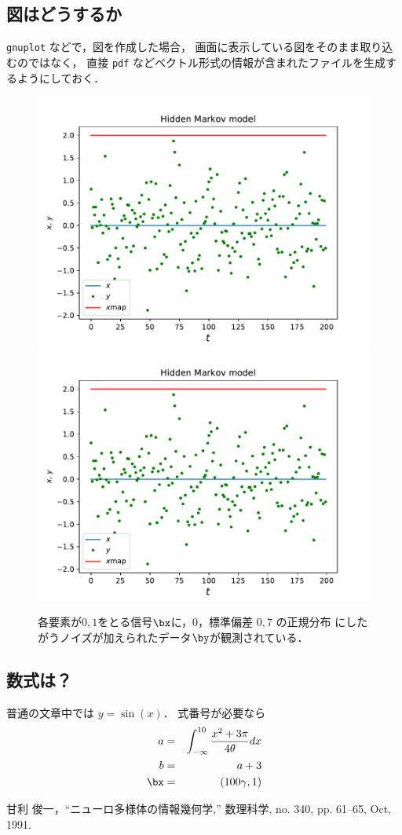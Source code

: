 \documentclass[a4paper,11pt,dvipdfmx]{jarticle}
\begin{document}
\subsection{図はどうするか}
{\tt gnuplot} などで，図を作成した場合，
画面に表示している図をそのまま取り込むのではなく，
直接 {\tt pdf} などベクトル形式の情報が含まれたファイルを生成するようにしておく．
\begin{figure}[h]
\begin{center}
\includegraphics[width=.4\linewidth]{fig_hmm212.pdf}
\hspace*{2mm}
\includegraphics[width=.4\linewidth]{fig_hmm212.pdf}
\caption{各要素が$0,1$をとる信号$\bx$に，$0$，標準偏差 $0,7$ の正規分布
 にしたがうノイズが加えられたデータ$\by$が観測されている．}
\end{center}
\end{figure}


\subsection{数式は？}
普通の文章中では $ y = \sin (x)$． 式番号が必要なら
\begin{eqnarray}
a &= & \int_{-\infty}^{10}  \frac{x^2+3 \pi}{4\theta} dx \\
b & = & a + 3 \\
\bx & = & (100 \gamma, 1) \nonumber 
\end{eqnarray}

%
%
%
%

\begin{thebibliography}{99}  %

甘利 俊一，``ニューロ多様体の情報幾何学,'' 
数理科学, no. 340, pp. 61--65, Oct, 1991.

\end{thebibliography}
\end{document}
